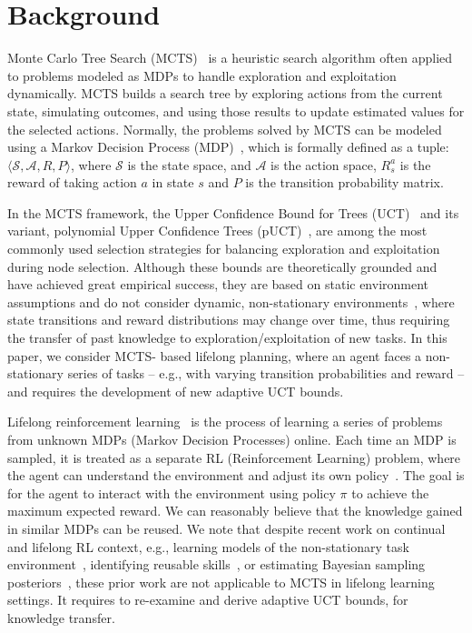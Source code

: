 \section{Background}



Monte Carlo Tree Search (MCTS)~\cite{kocsis2006bandit,silver2016mastering,schrittwieser2020mastering} is a heuristic search algorithm often applied to problems modeled as MDPs to handle exploration and exploitation dynamically.
MCTS builds a search tree by exploring actions from the current state, simulating outcomes, and using those results to update estimated values for the selected actions. 
Normally, the problems solved by MCTS can be modeled using a Markov Decision Process (MDP)~\cite{RL},
which is formally defined as a tuple: $\langle \mathcal{S}, \mathcal{A}, R, P \rangle$, where $\mathcal{S}$ is the state space, and $\mathcal{A}$ is the action space, $R_s^a$ is the reward of taking action $a$ in state $s$ and $P$ is the transition probability matrix.

In the MCTS framework, the Upper Confidence Bound for Trees (UCT)~\cite{coulom2006efficient} and its variant, polynomial Upper Confidence Trees (pUCT)~\cite{matsuzaki2018empirical,auger2013continuous}, are among the most commonly used selection strategies for balancing exploration and exploitation during node selection.
Although these bounds are theoretically grounded and have achieved great empirical success, they are based on static environment assumptions and do not consider dynamic, non-stationary environments~\cite{pourshamsaei2024predictive,hernandez2017survey,goldberg2003maximizing}, where state transitions and reward distributions may change over time, thus requiring the transfer of past knowledge to exploration/exploitation of new tasks. In this paper, we consider MCTS-
based lifelong planning, where an agent faces a
non-stationary series of tasks – e.g., with varying transition probabilities and reward -- and requires the development of new  adaptive UCT bounds.


Lifelong reinforcement learning~\cite{lecarpentier2021lipschitzlifelongreinforcementlearning,xie2020deep,fu2022model,lu2020reset,auger2013continuous,zou2024distributed,zhang2024distributed} is the process of learning a series of problems from unknown MDPs (Markov Decision Processes) online.
Each time an MDP is sampled, it is treated as a separate RL (Reinforcement Learning) problem, where the agent can understand the environment and adjust its own policy~\cite{da2018autonomously,hawasly2013lifelong,abel2018policy,zhang2024collaborative,zhang2024modeling}. The goal is for the agent to interact with the environment using policy $\pi$ to achieve the maximum expected reward.
We can reasonably believe that the knowledge gained in similar MDPs can be reused.
We note that despite recent work on continual and lifelong RL context, e.g., learning models of the non-stationary task environment~\cite{xie2020deep}, identifying reusable skills~\cite{lu2020reset}, or estimating Bayesian sampling posteriors~\cite{fu2022model}, these prior work are not applicable to MCTS in lifelong learning settings. It requires to re-examine and derive adaptive UCT bounds, for knowledge transfer.
 
